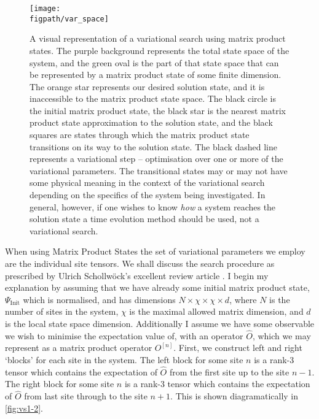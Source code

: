 \begin{figure}[ht!]
\centering
\texttt{[image: \\figpath/var\_space]}
\caption{A visual representation of a variational search using matrix product states. The purple background represents the total state space of the system, and the green oval is the part of that state space that can be represented by a matrix product state of some finite dimension. The orange star represents our desired solution state, and it is inaccessible to the matrix product state space. The black circle is the initial matrix product state, the black star is the nearest matrix product state approximation to the solution state, and the black squares are states through which the matrix product state transitions on its way to the solution state. The black dashed line represents a variational step -- optimisation over one or more of the variational parameters. The transitional states may or may not have some physical meaning in the context of the variational search depending on the specifics of the system being investigated. In general, however, if one wishes to know \emph{how} a system reaches the solution state a time evolution method should be used, not a variational search.}
\label{fig:vs1-1}
\end{figure}

When using Matrix Product States the set of variational parameters we employ are the individual site tensors. We shall discuss the search procedure as prescribed by Ulrich Schollw\"{o}ck's excellent review article \cite{Schollwoeck11}. I begin my explanation by assuming that we have already some initial matrix product state, \(\Psi_{\mathrm{Init}}\) which is normalised, and has dimensions \(N \times \chi \times \chi \times d\), where \(N\) is the number of sites in the system, \(\chi\) is the maximal allowed matrix dimension, and \(d\) is the local state space dimension. Additionally I assume we have some observable we wish to minimise the expectation value of, with an operator \(\hat{O}\), which we may represent as a matrix product operator \(O^{[n]}\). First, we construct left and right `blocks' for each site in the system. The left block for some site \(n\) is a rank-3 tensor which contains the expectation of \(\hat{O}\) from the first site up to the site \(n-1\). The right block for some site \(n\) is a rank-3 tensor which contains the expectation of \(\hat{O}\) from last site through to the site \(n+1\). This is shown diagramatically in \cref{fig:vs1-2}.


